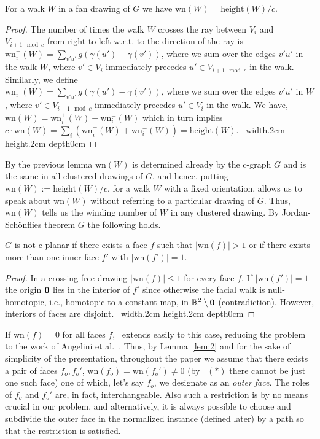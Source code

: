 \documentclass{llncs}
\def\qed{ \ \vrule width.2cm height.2cm depth0cm\smallskip}
\def\wn{\mathrm{wn}}
\def\length{\mathrm{height}}
\begin{document}
\begin{lemma}
\label{lemma:wn}
For a walk $W$ in a fan drawing of $G$ we have $\wn(W)=\length(W)/c$.
\end{lemma}

\begin{proof}
The number of times
the walk $W$ crosses the ray between $V_i$ and $V_{i+1 \mod c}$ from right
to left w.r.t. to the direction of the ray is $\wn_i^+(W)=\sum_{{v'u'}} g(\gamma(u')-\gamma(v'))$, 
where we sum over the edges $v'u'$ in the walk $W$, where
 $v'\in V_i$ immediately precedes $u'\in V_{i+1 \mod c}$ in the walk.
 Similarly, we define \\  $\wn_i^-(W)=\sum_{{v'u'}} g(\gamma(u')-\gamma(v'))$, 
where we sum over the edges $v'u'$ in $W$, where
 $v'\in V_{i+1 \mod c}$ immediately precedes $u'\in V_{i}$ in the walk.
We have, $\wn(W) = \wn_i^+(W) + \wn_i^-(W)$
which in turn implies $c\cdot\wn(W) = \sum_{i} (\wn_i^+(W) + \wn_i^-(W))=\length(W) $.
\qed\end{proof}

 
By the previous lemma $\wn(W)$ is determined already by the c-graph $G$ and is the same in all  clustered drawings of $G$, and hence, putting $\wn(W):=\length(W)/c$, for a walk $W$ with a fixed orientation, allows us to speak about $\wn(W)$ without
referring to a particular drawing of $G$.
 Thus, $\wn(W)$ tells us the winding number of $W$ in any clustered 
drawing.
By Jordan-Sch\"onflies theorem $G$ the following holds. 

\begin{lemma}
\label{lem:2}
$G$ is not c-planar if there exists a face $f$ such that $|\wn(f)|>1$ or if there exists more than one inner face $f'$ with $|\wn(f')|=1$.
\end{lemma}
\begin{proof}
In a crossing free drawing  $|\wn(f)|\le 1$ for every face $f$.
If $|\wn(f')|=1$ the origin ${\bf 0}$ lies in the interior of $f'$ since
otherwise the facial walk is null-homotopic, i.e., homotopic to a constant map, in $\mathbb{R}^2\setminus {\bf 0}$ (contradiction). However, interiors of faces are disjoint.
\qed\end{proof}
 If $\wn(f)=0$ for all faces $f$,~\cite[Lemma 1.2]{F14+} extends easily to this case,
reducing the problem to the work of Angelini et al.~\cite{ADDF13}.
Thus, by Lemma~\ref{lem:2} and for the sake of simplicity of the presentation, throughout the paper we assume that there exists a pair  of faces $f_o,f_o'$, $\wn(f_o)=\wn(f_o')\not=0$  (by
~$(*)$ there cannot be just one such face) one of which, let's say $f_o$,
we designate as an \emph{outer face}.  The roles of $f_o$ and $f_o'$ are, in fact, interchangeable.
Also such a restriction is by no means crucial in our problem, and alternatively, it is always possible
to choose and subdivide the outer face in the normalized instance (defined later) by a path so that the restriction is satisfied.
\end{document}
